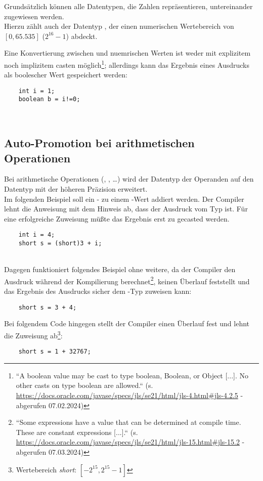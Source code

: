 \noindent
Grundsätzlich können alle Datentypen, die Zahlen repräsentieren, untereinander zugewiesen werden.\\
Hierzu zählt auch der Datentyp , der einen numerischen Wertebereich von $[0, 65.535]$ ($2^{16}-1$) abdeckt.

\noindent
Eine Konvertierung zwischen  und nuemrischen Werten ist weder mit explizitem noch implizitem casten möglich\footnote{
``A boolean value may be cast to type boolean, Boolean, or Object [...]. No other casts on type boolean are allowed.`` (s. \url{https://docs.oracle.com/javase/specs/jls/se21/html/jls-4.html#jls-4.2.5} - abgerufen 07.02.2024)
}; allerdings kann das Ergebnis eines Ausdrucks als boolescher Wert gespeichert werden:
\begin{verbatim}
    int i = 1;
    boolean b = i!=0;
\end{verbatim}\\

\subsection{Auto-Promotion bei arithmetischen Operationen}

Bei arithmetische Operationen (\code{+}, \code{-}, \ldots) wird der Datentyp der Operanden auf den Datentyp mit der höheren Präzision erweitert.\\

\noindent
Im folgenden Beispiel soll ein - zu einem -Wert addiert werden.
Der Compiler lehnt die Anweisung mit dem Hinweis ab, dass der Ausdruck  vom Typ  ist.
Für eine erfolgreiche Zuweisung müßte das Ergebnis erst zu  gecasted werden.

\begin{verbatim}
    int i = 4;
    short s = (short)3 + i;
\end{verbatim}\\

Dagegen funktioniert folgendes Beispiel ohne weitere, da der Compiler den Ausdruck während der Kompilierung berechnet\footnote{
    ``Some expressions have a value that can be determined at compile time. These are constant expressions [...].`` (s. \url{https://docs.oracle.com/javase/specs/jls/se21/html/jls-15.html#jls-15.2} - abgerufen 07.03.2024)
}, keinen Überlauf feststellt und das Ergebnis des Ausdrucks sicher dem -Typ zuweisen kann:

\begin{verbatim}
    short s = 3 + 4;
\end{verbatim}

Bei folgendem Code hingegen stellt der Compiler einen Überlauf fest und lehnt die Zuweisung ab\footnote{Wertebereich \textit{short}: $[-2^{15}, 2^{15} -1]$}:

\begin{verbatim}
    short s = 1 + 32767;
\end{verbatim}


